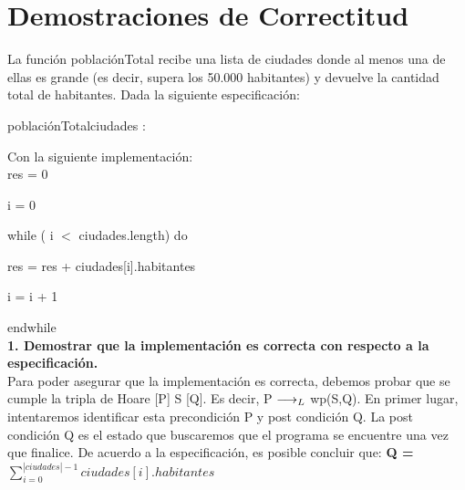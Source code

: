 \documentclass[10pt,a4paper]{article}
\begin{document}

\section{Demostraciones de Correctitud}



La función poblaciónTotal recibe una lista de ciudades donde al menos una de ellas es grande (es decir, supera los 50.000 habitantes) y devuelve la cantidad total de habitantes. Dada la siguiente especificación:

\begin{proc}{poblaciónTotal}{\In ciudades : \TLista{\str\times\ent}}{\ent}
\end{proc}
Con la siguiente implementación:\\

    res = 0
    
    i = 0
    
    while ( i $<$ ciudades.length) do
    
    \hspace{0.7cm}res = res + ciudades[i].habitantes
    
    \hspace{0.7cm}i = i + 1
    
    endwhile\\

\newpage
\textbf{1. Demostrar que la implementación es correcta con respecto a la especificación.}\\

Para poder asegurar que la implementación es correcta, debemos probar que se cumple la tripla de Hoare [P] S [Q]. Es decir, P $\longrightarrow _L$ wp(S,Q). En primer lugar, intentaremos identificar esta precondición P y post condición Q.
La post condición Q es el estado que buscaremos que el programa se encuentre una vez que finalice. De acuerdo a la especificación, es posible concluir que:
\textbf{{Q = ${\sum\limits_{i=0}^{|ciudades| - 1}ciudades[i].habitantes}$}}
\end{document}
